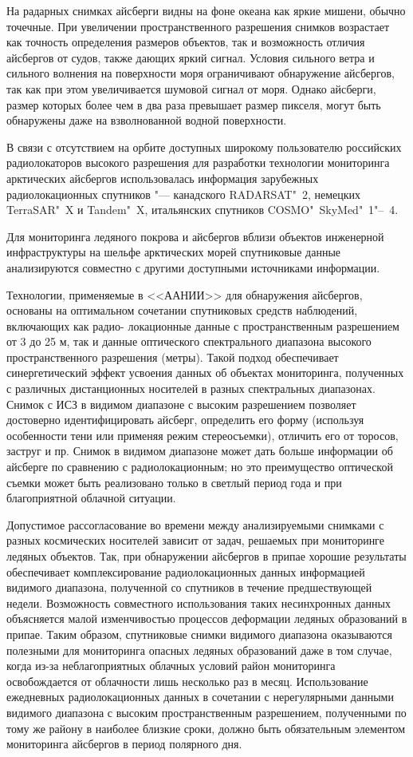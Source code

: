 На радарных снимках айсберги видны на фоне океана как яркие мишени, обычно точечные. При увеличении пространственного разрешения снимков возрастает как точность определения размеров объектов, так и возможность  отличия айсбергов от судов, также дающих яркий сигнал. Условия сильного ветра и сильного волнения на поверхности моря ограничивают обнаружение айсбергов, так как при этом увеличивается шумовой сигнал от моря. Однако айсберги, размер которых более чем в два раза превышает размер  пикселя, могут быть обнаружены даже на взволнованной водной поверхности.

В связи с отсутствием на орбите доступных широкому пользователю российских радиолокаторов высокого разрешения для разработки технологии мониторинга арктических айсбергов использовалась информация зарубежных радиолокационных спутников "--- канадского RADARSAT"~2, немецких TerraSAR"~X и Tandem"~X, итальянских спутников COSMO"~SkyMed"~1"--~4.

Для мониторинга ледяного покрова и айсбергов вблизи объектов инженерной 
инфраструктуры на шельфе арктических морей спутниковые данные анализируются 
совместно с другими доступными источниками информации.

Технологии, применяемые в <<ААНИИ>> для обнаружения айсбергов, основаны на 
оптимальном сочетании спутниковых средств наблюдений, включающих как радио-
локационные данные с пространственным разрешением от 3 до 25 м, так и данные 
оптического спектрального диапазона высокого пространственного разрешения 
(метры). Такой подход обеспечивает синергетический эффект усвоения данных об 
объектах мониторинга, полученных с различных дистанционных носителей в разных спектральных диапазонах. Снимок с ИСЗ в видимом диапазоне с высоким разрешением позволяет достоверно идентифицировать айсберг, определить его форму (используя особенности тени или применяя режим стереосъемки), отличить его от торосов, заструг и пр.  Снимок в видимом диапазоне может дать больше информации об айсберге по сравнению с радиолокационным; но это преимущество оптической съемки может быть реализовано только в светлый период года и при благоприятной облачной ситуации.

Допустимое рассогласование во времени между анализируемыми снимками с разных космических носителей зависит от задач, решаемых при мониторинге ледяных объектов. Так, при обнаружении айсбергов в припае хорошие результаты  обеспечивает комплексирование радиолокационных данных информацией видимого  диапазона, полученной со спутников в течение предшествующей недели. Возможность совместного использования таких несинхронных данных объясняется малой изменчивостью процессов деформации ледяных образований в припае. Таким образом, спутниковые снимки видимого диапазона оказываются полезными для мониторинга опасных ледяных образований даже в том случае, когда из-за неблагоприятных облачных условий район мониторинга освобождается от облачности лишь несколько раз в месяц. Использование ежедневных радиолокационных данных в сочетании с нерегулярными данными видимого диапазона с высоким пространственным разрешением, полученными по тому же району в наиболее близкие сроки, должно быть обязательным элементом мониторинга айсбергов в период полярного дня.

